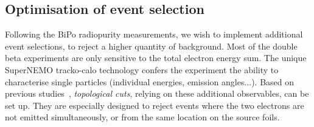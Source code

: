 \subsection{Optimisation of event selection}
\label{subsec:opti_ev_selection}

Following the BiPo radiopurity measurements, we wish to implement additional event selections, to reject a higher quantity of background.
Most of the double beta experiments are only sensitive to the total electron energy sum.
The unique SuperNEMO tracko-calo technology confers the experiment the ability to characterise single particles (individual energies, emission angles...).
Based on previous studies~\cite{CalvezThesis,ChaponThesis}, \emph{topological cuts}, relying on these additional observables, can be set up.
They are especially designed to reject events where the two electrons are not emitted simultaneously, or from the same location on the source foils.

